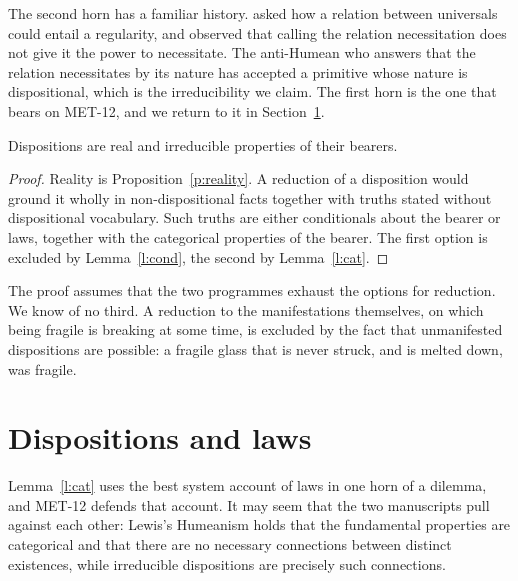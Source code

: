 \documentclass{situationist-preprint}
\begin{document}
The second horn has a familiar history. \citet{vanFraassen1989} asked how a relation between universals could entail a regularity, and \citet{Lewis1983} observed that calling the relation necessitation does not give it the power to necessitate. The anti-Humean who answers that the relation necessitates by its nature has accepted a primitive whose nature is dispositional, which is the irreducibility we claim. The first horn is the one that bears on MET-12, and we return to it in Section~\ref{s:laws}.

\begin{theorem}\label{t:main}
Dispositions are real and irreducible properties of their bearers.
\end{theorem}

\begin{proof}
Reality is Proposition~\ref{p:reality}. A reduction of a disposition would ground it wholly in non-dispositional facts together with truths stated without dispositional vocabulary. Such truths are either conditionals about the bearer or laws, together with the categorical properties of the bearer. The first option is excluded by Lemma~\ref{l:cond}, the second by Lemma~\ref{l:cat}.
\end{proof}

The proof assumes that the two programmes exhaust the options for reduction. We know of no third. A reduction to the manifestations themselves, on which being fragile is breaking at some time, is excluded by the fact that unmanifested dispositions are possible: a fragile glass that is never struck, and is melted down, was fragile.

\section{Dispositions and laws}\label{s:laws}

Lemma~\ref{l:cat} uses the best system account of laws in one horn of a dilemma, and MET-12 defends that account. It may seem that the two manuscripts pull against each other: Lewis's Humeanism holds that the fundamental properties are categorical and that there are no necessary connections between distinct existences, while irreducible dispositions are precisely such connections.
\end{document}
